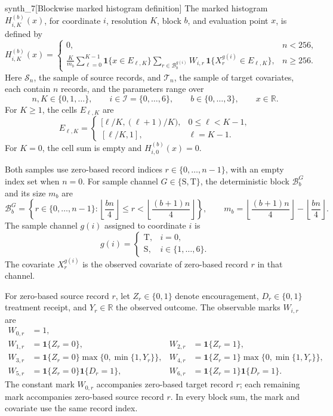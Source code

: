 \documentclass[11pt]{article}
\begin{document}
\begin{definitionv}{synth_7}[Blockwise marked histogram definition]
The marked histogram \(H_{i,K}^{(b)}(x)\), for coordinate \(i\), resolution \(K\), block \(b\), and evaluation point \(x\), is defined by
\[
H_{i,K}^{(b)}(x)=
\begin{cases}
0,&n<256,\\[2mm]
\displaystyle
\frac{K}{m_b}
\sum_{\ell=0}^{K-1}
\mathbf 1\{x\in E_{\ell,K}\}
\sum_{r\in\mathcal B_b^{g(i)}}
W_{i,r}\,
\mathbf 1\{X_r^{g(i)}\in E_{\ell,K}\},
&n\ge256.
\end{cases}
\]
Here \(\mathcal S_n\), the sample of source records, and \(\mathcal T_n\), the sample of target covariates, each contain \(n\) records, and the parameters range over
\[
n,K\in\{0,1,\ldots\},\qquad
i\in\mathcal I=\{0,\ldots,6\},\qquad
b\in\{0,\ldots,3\},\qquad
x\in\mathbb R.
\]
For \(K\ge1\), the cells \(E_{\ell,K}\) are
\[
E_{\ell,K}=
\begin{cases}
[\ell/K,(\ell+1)/K),&0\le\ell<K-1,\\
[\ell/K,1],&\ell=K-1.
\end{cases}
\]
For \(K=0\), the cell sum is empty and \(H_{i,0}^{(b)}(x)=0\).

Both samples use zero-based record indices \(r\in\{0,\ldots,n-1\}\), with an empty index set when \(n=0\). For sample channel \(G\in\{\mathrm S,\mathrm T\}\), the deterministic block \(\mathcal B_b^G\) and its size \(m_b\) are
\[
\mathcal B_b^G
=
\left\{
r\in\{0,\ldots,n-1\}:
\left\lfloor\frac{bn}{4}\right\rfloor
\le r<
\left\lfloor\frac{(b+1)n}{4}\right\rfloor
\right\},
\qquad
m_b=
\left\lfloor\frac{(b+1)n}{4}\right\rfloor
-
\left\lfloor\frac{bn}{4}\right\rfloor.
\]
The sample channel \(g(i)\) assigned to coordinate \(i\) is
\[
g(i)=
\begin{cases}
\mathrm T,&i=0,\\
\mathrm S,&i\in\{1,\ldots,6\}.
\end{cases}
\]
The covariate \(X_r^{g(i)}\) is the observed covariate of zero-based record \(r\) in that channel.

For zero-based source record \(r\), let \(Z_r\in\{0,1\}\) denote encouragement, \(D_r\in\{0,1\}\) treatment receipt, and \(Y_r\in\mathbb R\) the observed outcome. The observable marks \(W_{i,r}\) are
\[
\begin{aligned}
W_{0,r}&=1,\\
W_{1,r}&=\mathbf 1\{Z_r=0\},
&
W_{2,r}&=\mathbf 1\{Z_r=1\},\\
W_{3,r}&=\mathbf 1\{Z_r=0\}\max\{0,\min\{1,Y_r\}\},
&
W_{4,r}&=\mathbf 1\{Z_r=1\}\max\{0,\min\{1,Y_r\}\},\\
W_{5,r}&=\mathbf 1\{Z_r=0\}\mathbf 1\{D_r=1\},
&
W_{6,r}&=\mathbf 1\{Z_r=1\}\mathbf 1\{D_r=1\}.
\end{aligned}
\]
The constant mark \(W_{0,r}\) accompanies zero-based target record \(r\); each remaining mark accompanies zero-based source record \(r\). In every block sum, the mark and covariate use the same record index.
\end{definitionv}
\end{document}
